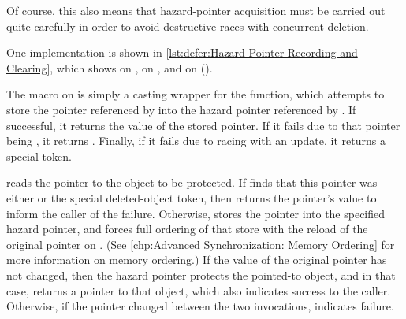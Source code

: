 \begin{listing}

\caption{Hazard-Pointer Recording and Clearing}
\label{lst:defer:Hazard-Pointer Recording and Clearing}
\end{listing}

Of course, this also means that hazard-pointer acquisition must be
carried out quite carefully in order to avoid destructive races with
concurrent deletion.
\begin{fcvref}
One implementation is shown in
\cref{lst:defer:Hazard-Pointer Recording and Clearing},
which shows  on ,
 on , and
 on
 ().

The  macro on  is simply a casting
wrapper for the  function, which attempts to store
the pointer referenced by  into the hazard pointer referenced
by .
If successful, it returns the value of the stored pointer.
If it fails due to that pointer being , it returns .
Finally, if it fails due to racing with an update, it returns a special
 token.

\QuickQuizEnd

 reads the pointer to the object to be protected.
If  finds that this pointer was either  or
the special  deleted-object token, then  returns
the pointer's value to inform the caller of the failure.
Otherwise,  stores the pointer into the specified
hazard pointer, and  forces full ordering of that
store with the reload of the original pointer on .
(See \cref{chp:Advanced Synchronization: Memory Ordering}
for more information on memory ordering.)
If the value of the original pointer has not changed, then the hazard
pointer protects the pointed-to object, and in that case,
 returns a pointer to that object, which also
indicates success to the caller.
Otherwise, if the pointer changed between the two 
invocations,  indicates failure.


\end{fcvref}
